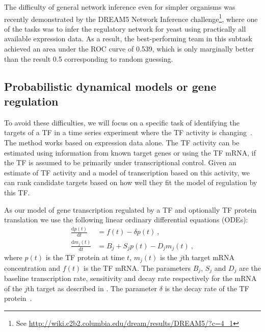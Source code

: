 \documentclass[11pt]{article}
\begin{document}
The difficulty of general network inference even for simpler organisms
was recently demonstrated by the DREAM5 Network Inference
challenge\footnote{See
  \url{http://wiki.c2b2.columbia.edu/dream/results/DREAM5/?c=4_1}},
where one of the tasks was to infer the regulatory network for yeast
using practically all available expression data.  As a result, the
best-performing team in this subtask achieved an area under the ROC
curve of 0.539, which is only marginally better than the result 0.5
corresponding to random guessing.

\subsection{Probabilistic dynamical models or gene regulation}

To avoid these difficulties, we will focus on a specific task of
identifying the targets of a TF in a time series experiment where the
TF activity is changing~\cite{Gao2008,Honkela2010PNAS}.  The method
works based on expression data alone.  The TF activity can be
estimated using information from known target genes or using the TF
mRNA, if the TF is assumed to be primarily under transcriptional
control.  Given an estimate of TF activity and a model of
transcription based on this activity, we can rank candidate targets
based on how well they fit the model of regulation by this TF.

As our model of gene transcription regulated by a TF and optionally
TF protein translation we use the following linear ordinary
differential equations (ODEs):
\begin{align}
  \frac{\mathrm{d}p(t)}{\mathrm{d}t} & = f(t) - \delta
  p(t) \ , \label{eq:translation_ode} \\
  \frac{\mathrm{d}m_j(t)}{\mathrm{d}t} & = B_j+S_j p(t)-D_j m_j(t) \ , \label{eq:transcription_ode}
\end{align}
where $p(t)$ is the TF protein at time $t$, $m_j(t)$ is the $j$th
target mRNA concentration and $f(t)$ is the TF mRNA. The parameters
$B_j$, $S_j$ and $D_j$ are the baseline transcription rate,
sensitivity and decay rate respectively for the mRNA of the $j$th
target as described in \cite{Barenco2006a}.  The parameter
$\delta$ is the decay rate of the TF protein~\cite{Honkela2010PNAS}.
\end{document}
